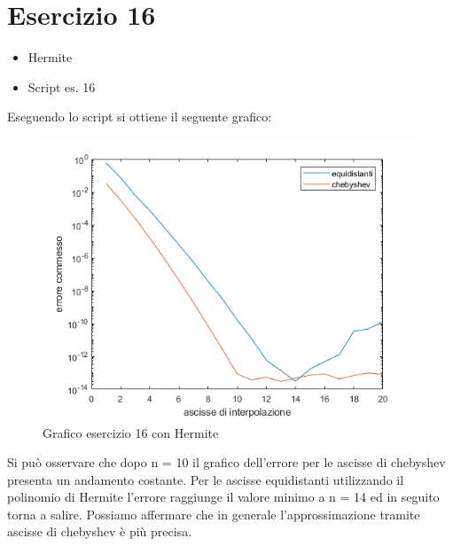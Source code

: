 \section{Esercizio 16}
\begin{itemize}
\item Hermite

\item Script es. 16

\end{itemize}
Eseguendo lo script si ottiene il seguente grafico: 

\begin{figure}[h!]
    \includegraphics[scale=0.8]{CodiceMatlab/Esercizio15-19/graficoEs16.png}
    \caption{Grafico esercizio 16 con Hermite}
    \label{fig:es16}    
\end{figure}

Si può osservare che dopo n = 10  il grafico dell'errore per le ascisse di chebyshev  presenta un andamento costante. 
Per le ascisse equidistanti utilizzando il polinomio di Hermite l'errore raggiunge il valore minimo a n = 14 ed in seguito torna a salire.
Possiamo affermare che in generale l'approssimazione tramite ascisse di chebyshev è più precisa.

